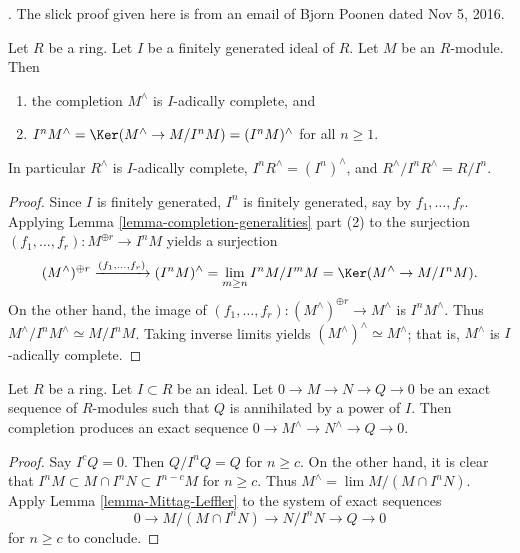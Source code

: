 \begin{lemma}
\label{lemma-hathat-finitely-generated}
\begin{reference}
\cite[Theorem 15]{Matlis}. The slick proof given here is from
an email of Bjorn Poonen dated Nov 5, 2016.
\end{reference}
Let $R$ be a ring. Let $I$ be a finitely generated ideal of $R$.
Let $M$ be an $R$-module. Then
\begin{enumerate}
\item the completion $M^\wedge$ is $I$-adically complete, and
\item $I^nM^\wedge = \Ker(M^\wedge \to M/I^nM) = (I^nM)^\wedge$ for all
$n \geq 1$.
\end{enumerate}
In particular $R^\wedge$ is $I$-adically complete,
$I^nR^\wedge = (I^n)^\wedge$, and
$R^\wedge/I^nR^\wedge = R/I^n$.
\end{lemma}

\begin{proof}
Since $I$ is finitely generated,
$I^n$ is finitely generated, say by $f_1, \ldots, f_r$.
Applying Lemma \ref{lemma-completion-generalities} part (2)
to the surjection $(f_1, \ldots, f_r) : M^{\oplus r} \to I^n M$
yields a surjection
$$
(M^\wedge)^{\oplus r} \xrightarrow{(f_1, \ldots, f_r)} (I^n M)^\wedge =
\lim_{m \geq n} I^n M/I^m M = \Ker(M^\wedge \to M/I^n M).
$$
On the other hand, the image of
$(f_1, \ldots, f_r) : (M^\wedge)^{\oplus r} \to M^\wedge$
is $I^n M^\wedge$.
Thus $M^\wedge / I^n M^\wedge \simeq M/I^n M$.
Taking inverse limits yields $(M^\wedge)^\wedge \simeq M^\wedge$;
that is, $M^\wedge$ is $I$-adically complete.
\end{proof}

\begin{lemma}
\label{lemma-completion-differ-by-torsion}
Let $R$ be a ring. Let $I \subset R$ be an ideal. Let
$0 \to M \to N \to Q \to 0$ be an exact sequence of
$R$-modules such that $Q$ is annihilated by a power of $I$.
Then completion produces an exact sequence
$0 \to M^\wedge \to N^\wedge \to Q \to 0$.
\end{lemma}

\begin{proof}
Say $I^c Q = 0$. Then $Q/I^nQ = Q$ for $n \geq c$.
On the other hand, it is clear that
$I^nM \subset M \cap I^nN \subset I^{n - c}M$ for $n \geq c$.
Thus $M^\wedge = \lim M/(M \cap I^n N)$. Apply Lemma \ref{lemma-Mittag-Leffler}
to the system of exact sequences
$$
0 \to M/(M \cap I^n N) \to N/I^n N \to Q \to 0
$$
for $n \geq c$ to conclude.
\end{proof}

